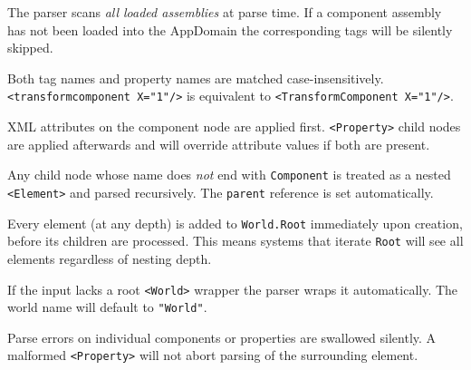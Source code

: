 \documentclass[11pt,a4paper]{article}
\begin{document}
\begin{description}[leftmargin=3cm, style=nextline]
  \item[Type lookup]
    The parser scans \emph{all loaded assemblies} at parse time.  If a
    component assembly has not been loaded into the AppDomain the corresponding
    tags will be silently skipped.

  \item[Case insensitivity]
    Both tag names and property names are matched case-insensitively.
    \texttt{<transformcomponent X="1"/>} is equivalent to
    \texttt{<TransformComponent X="1"/>}.

  \item[Property precedence]
    XML attributes on the component node are applied first.
    \texttt{<Property>} child nodes are applied afterwards and will override
    attribute values if both are present.

  \item[Nested elements as children]
    Any child node whose name does \emph{not} end with \texttt{Component} is
    treated as a nested \texttt{<Element>} and parsed recursively.  The
    \texttt{parent} reference is set automatically.

  \item[World.Root population]
    Every element (at any depth) is added to \texttt{World.Root} immediately
    upon creation, before its children are processed.  This means systems that
    iterate \texttt{Root} will see all elements regardless of nesting depth.

  \item[Fragment tolerance]
    If the input lacks a root \texttt{<World>} wrapper the parser wraps it
    automatically.  The world name will default to \texttt{"World"}.

  \item[Error handling]
    Parse errors on individual components or properties are swallowed silently.
    A malformed \texttt{<Property>} will not abort parsing of the surrounding
    element.
\end{description}
\end{document}
